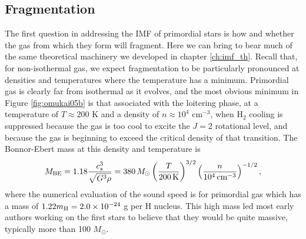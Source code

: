 \subsection{Fragmentation}

 The first question in addressing the IMF of primordial stars is how and whether the gas from which they form will fragment. Here we can bring to bear much of the same theoretical machinery we developed in chapter \ref{ch:imf_th}. Recall that, for non-isothermal gas, we expect fragmentation to be particularly pronounced at densities and temperatures where the temperature has a minimum. Primordial gas is clearly far from isothermal as it evolves, and the most obvious minimum in Figure \ref{fig:omukai05b} is that associated with the loitering phase, at a temperature of $T\approx 200$ K and a density of $n\approx 10^4$ cm$^{-3}$, when H$_2$ cooling is suppressed because the gas is too cool to excite the $J=2$ rotational level, and because the gas is beginning to exceed the critical density of that transition. The Bonnor-Ebert mass at this density and temperature is
\begin{equation}
M_{\rm BE} = 1.18 \frac{c_s^3}{\sqrt{G^3\rho}} = 380\,M_\odot \left(\frac{T}{200\,\mathrm{K}}\right)^{3/2} \left(\frac{n}{10^4\,\mathrm{cm}^{-3}}\right)^{-1/2},
\end{equation}
where the numerical evaluation of the sound speed is for primordial gas which has a mass of $1.22m_{\rm H}=2.0\times 10^{-24}$ g per H nucleus. This high mass led most early authors working on the first stars to believe that they would be quite massive, typically more than 100 $M_\odot$.

